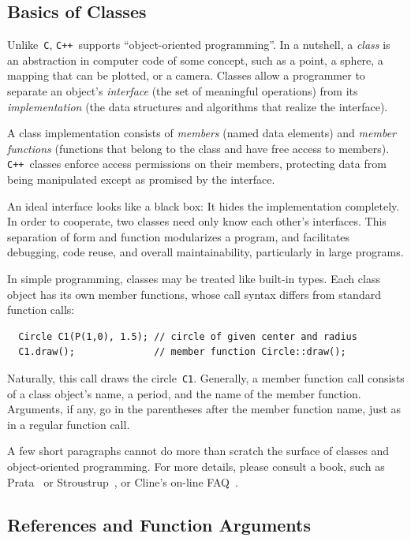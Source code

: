\documentclass[12pt,letterpaper]{book}
\newcommand{\code}[1]{\texttt{#1}}
\newcommand{\CXX}{\code{C++}}
\begin{document}
\subsection{Basics of Classes}

Unlike~\code{C}, \CXX\ supports ``object-oriented programming''. In a
nutshell, a \emph{class} is an abstraction in computer code of some
concept, such as a point, a sphere, a mapping that can be plotted, or
a camera. Classes allow a programmer to separate an object's
\emph{interface} (the set of meaningful operations) from its
\emph{implementation} (the data structures and algorithms that realize
the interface). 

A class implementation consists of \emph{members} (named data
elements) and \emph{member functions} (functions that belong to the
class and have free access to members).  \CXX\ classes enforce access
permissions on their members, protecting data from being manipulated
except as promised by the interface.

An ideal interface looks like a black box: It hides the implementation
completely.  In order to cooperate, two classes need only know each
other's interfaces. This separation of form and function modularizes a
program, and facilitates debugging, code reuse, and overall
maintainability, particularly in large programs. 

In simple programming, classes may be treated like built-in types.
Each class object has its own member functions, whose call syntax
differs from standard function calls:
\begin{verbatim}
  Circle C1(P(1,0), 1.5); // circle of given center and radius
  C1.draw();              // member function Circle::draw();
\end{verbatim}
Naturally, this call draws the circle~\code{C1}. Generally, a member
function call consists of a class object's name, a period, and the
name of the member function. Arguments, if any, go in the parentheses
after the member function name, just as in a regular function call.

A few short paragraphs cannot do more than scratch the surface of
classes and object-oriented programming. For more details, please
consult a book, such as Prata~\cite{Prata} or Stroustrup~\cite{S}, or
Cline's on-line FAQ~\cite{Cline}.


\subsection{References and Function Arguments}
\end{document}
